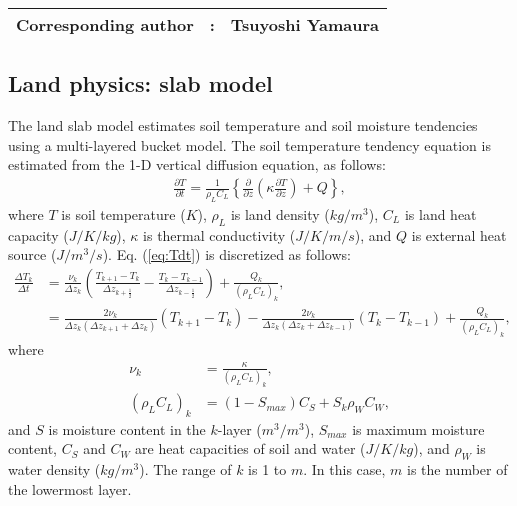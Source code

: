 {\bf \Large 
\begin{tabular}{ccc}
\hline
  Corresponding author & : & Tsuyoshi Yamaura\\
\hline
\end{tabular}
}


\subsection{Land physics: slab model}

The land slab model estimates soil temperature and soil moisture tendencies using a multi-layered bucket model.
The soil temperature tendency equation is estimated from the 1-D vertical diffusion equation, as follows:
\begin{align}
  \frac{\partial T}{\partial t} = \frac{1}{\rho_{L}C_{L}} \left\{ \frac{\partial}{\partial z} \left( \kappa \frac{\partial T}{\partial z} \right) + Q \right\},
  \label{eq:Tdt}
\end{align}
where $T$ is soil temperature ($K$), $\rho_{L}$ is land density ($kg/m^3$), $C_{L}$ is land heat capacity ($J/K/kg$), $\kappa$ is thermal conductivity ($J/K/m/s$), and $Q$ is external heat source ($J/m^3/s$).
Eq. (\ref{eq:Tdt}) is discretized as follows:
\begin{align}
  \frac{\Delta T_{k}}{\Delta t} &= \frac{\nu_{k}}{\Delta z_{k}} \left( \frac{T_{k+1}-T_{k}}{\Delta z_{k+\frac{1}{2}}} - \frac{T_{k}-T_{k-1}}{\Delta z_{k-\frac{1}{2}}} \right) + \frac{Q_{k}}{(\rho_{L}C_{L})_{k}}, \\
                                &= \frac{ 2\nu_{k} }{ \Delta z_{k} (\Delta z_{k+1}+\Delta z_{k}) }(T_{k+1}-T_{k}) - \frac{ 2\nu_{k} }{ \Delta z_{k} (\Delta z_{k}+\Delta z_{k-1}) }(T_{k}-T_{k-1}) +\frac{Q_{k}}{(\rho_{L}C_{L})_{k}},
\end{align}
where
\begin{align}
  \nu_{k} &= \frac{\kappa}{(\rho_{L}C_{L})_{k}}, \\
  (\rho_{L}C_{L})_{k} &= ( 1 - S_{max} ) C_{S} + S_{k} \rho_{W}C_{W},
\end{align}
and $S$ is moisture content in the $k$-layer ($m^3/m^3$), $S_{max}$ is maximum moisture content, $C_{S}$ and $C_{W}$ are heat capacities of soil and water ($J/K/kg$), and $\rho_{W}$ is water density ($kg/m^3$).
The range of $k$ is 1 to $m$.
In this case, $m$ is the number of the lowermost layer.
